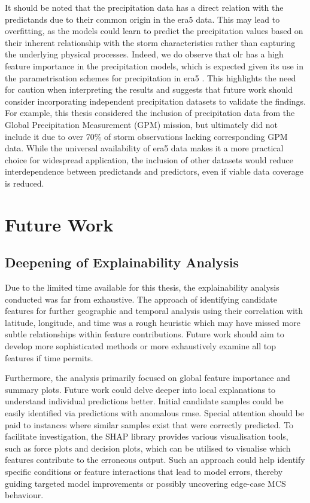 It should be noted that the precipitation data has a direct relation with the predictands due to their common origin in the \acrshort{era5} data. This may lead to overfitting, as the models could learn to predict the precipitation values based on their inherent relationship with the storm characteristics rather than capturing the underlying physical processes. Indeed, we do observe that \acrshort{olr} has a high feature importance in the precipitation models, which is expected given its use in the parametrisation schemes for precipitation in \acrshort{era5} \citep{Hersbach2020}. This highlights the need for caution when interpreting the results and suggests that future work should consider incorporating independent precipitation datasets to validate the findings. For example, this thesis considered the inclusion of precipitation data from the Global Precipitation Measurement (GPM) mission, but ultimately did not include it due to over 70\% of storm observations lacking corresponding GPM data. While the universal availability of \acrshort{era5} data makes it a more practical choice for widespread application, the inclusion of other datasets would reduce interdependence between predictands and predictors, even if viable data coverage is reduced.

\section{Future Work}
\label{sec:future-work}

\subsection{Deepening of Explainability Analysis}

Due to the limited time available for this thesis, the explainability analysis conducted was far from exhaustive. The approach of identifying candidate features for further geographic and temporal analysis using their correlation with latitude, longitude, and time was a rough heuristic which may have missed more subtle relationships within feature contributions. Future work should aim to develop more sophisticated methods or more exhaustively examine all top features if time permits.

Furthermore, the analysis primarily focused on global feature importance and summary plots. Future work could delve deeper into local explanations to understand individual predictions better. Initial candidate samples could be easily identified via predictions with anomalous \acrshort{rmse}. Special attention should be paid to instances where similar samples exist that were correctly predicted. To facilitate investigation, the SHAP library provides various visualisation tools, such as force plots and decision plots, which can be utilised to visualise which features contribute to the erroneous output. Such an approach could help identify specific conditions or feature interactions that lead to model errors, thereby guiding targeted model improvements or possibly uncovering edge-case MCS behaviour.

